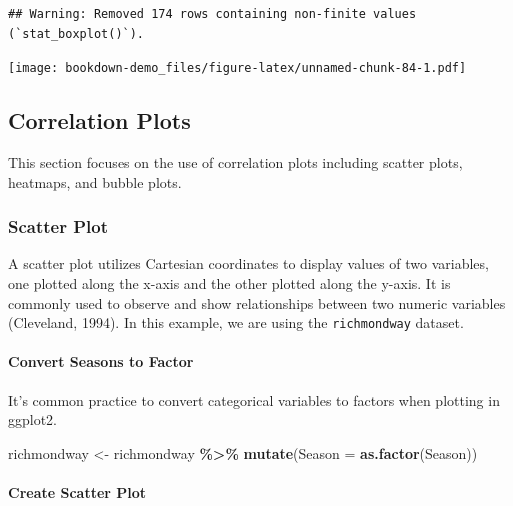 \documentclass[
  b5paper]{book}
\newenvironment{Shaded}{\begin{snugshade}}{\end{snugshade}}
\newcommand{\AttributeTok}[1]{\textcolor[rgb]{0.13,0.29,0.53}{#1}}
\newcommand{\FunctionTok}[1]{\textcolor[rgb]{0.13,0.29,0.53}{\textbf{#1}}}
\newcommand{\NormalTok}[1]{#1}
\newcommand{\OtherTok}[1]{\textcolor[rgb]{0.56,0.35,0.01}{#1}}
\newcommand{\SpecialCharTok}[1]{\textcolor[rgb]{0.81,0.36,0.00}{\textbf{#1}}}
\begin{document}
\begin{verbatim}
## Warning: Removed 174 rows containing non-finite values (`stat_boxplot()`).
\end{verbatim}

\texttt{[image: bookdown-demo\_files/figure-latex/unnamed-chunk-84-1.pdf]}

\hypertarget{correlation-plots}{%
\subsection*{Correlation Plots}\label{correlation-plots}}

This section focuses on the use of correlation plots including scatter plots, heatmaps, and bubble plots.

\hypertarget{scatter-plot}{%
\subsubsection*{Scatter Plot}\label{scatter-plot}}

A scatter plot utilizes Cartesian coordinates to display values of two variables, one plotted along the x-axis and the other plotted along the y-axis. It is commonly used to observe and show relationships between two numeric variables (Cleveland, 1994). In this example, we are using the \texttt{richmondway} dataset.

\hypertarget{convert-seasons-to-factor}{%
\paragraph*{Convert Seasons to Factor}\label{convert-seasons-to-factor}}

It's common practice to convert categorical variables to factors when plotting in ggplot2.

\begin{Shaded}
\begin{Highlighting}[]
\NormalTok{richmondway }\OtherTok{\textless{}{-}}\NormalTok{ richmondway }\SpecialCharTok{\%\textgreater{}\%}
  \FunctionTok{mutate}\NormalTok{(}\AttributeTok{Season =} \FunctionTok{as.factor}\NormalTok{(Season))}
\end{Highlighting}
\end{Shaded}

\hypertarget{create-scatter-plot}{%
\paragraph*{Create Scatter Plot}\label{create-scatter-plot}}
\end{document}
